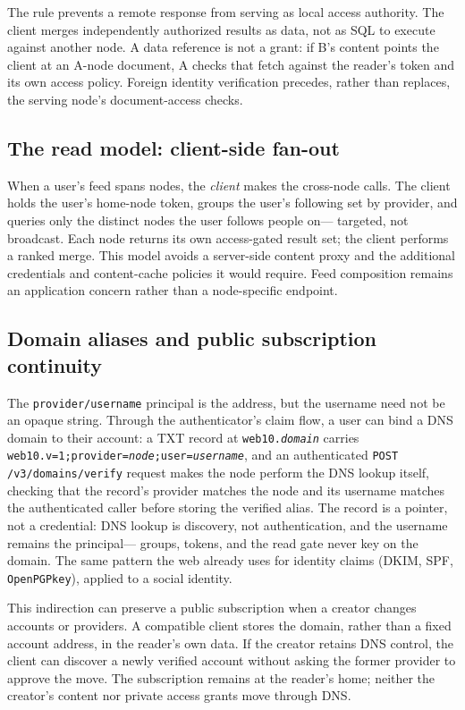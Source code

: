 \documentclass[sigconf, nonacm]{acmart}
\begin{document}
The rule prevents a remote response from serving as local access authority.
The client merges independently authorized results as data, not as SQL to
execute against another node. A data reference is not a grant: if B's content
points the client at an A-node document, A checks that fetch against the
reader's token and its own access policy. Foreign identity verification
precedes, rather than replaces, the serving node's document-access checks.

\subsection{The read model: client-side fan-out}

When a user's feed spans nodes, the \emph{client} makes the cross-node calls.
The client holds the user's home-node token, groups the user's following set by
provider, and queries only the distinct nodes the user follows people on---
targeted, not broadcast. Each node returns its own access-gated result set; the
client performs a ranked merge. This model avoids a server-side content proxy
and the additional credentials and content-cache policies it would require.
Feed composition remains an application concern rather than a node-specific
endpoint.

\subsection{Domain aliases and public subscription continuity}

The \texttt{provider/username} principal is the address, but the username need
not be an opaque string. Through the authenticator's claim flow, a user can
bind a DNS domain to their account: a TXT record at
\texttt{web10.\emph{domain}} carries
\texttt{web10.v=1;\allowbreak provider=\emph{node};\allowbreak user=\emph{username}}, and an
authenticated \texttt{POST /v3/domains/verify} request makes the node perform
the DNS lookup itself, checking that the record's provider matches the node
and its username matches the authenticated caller before storing the
verified alias. The record is a pointer, not a credential: DNS lookup is
discovery, not authentication, and the username remains the principal---
groups, tokens, and the read gate never key on the domain. The same pattern
the web already uses for identity claims (DKIM, SPF, \texttt{OpenPGPkey}),
applied to a social identity.

This indirection can preserve a public subscription when a creator changes
accounts or providers. A compatible client stores the domain, rather than a
fixed account address, in the reader's own data. If the creator retains DNS
control, the client can discover a newly verified account without asking the
former provider to approve the move. The subscription remains at the reader's
home; neither the creator's content nor private access grants move through DNS.
\end{document}
